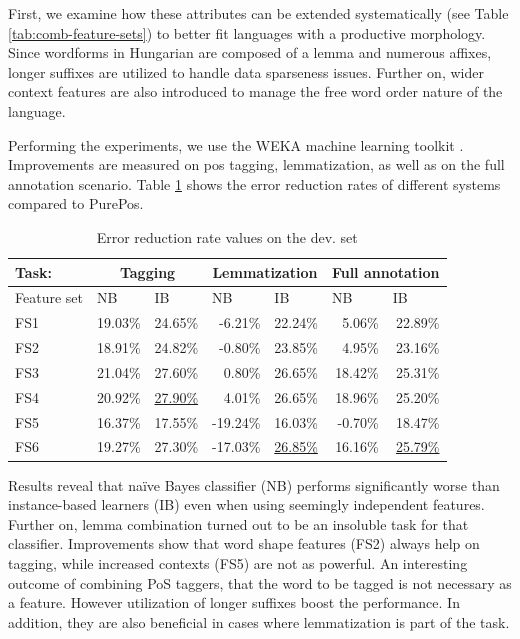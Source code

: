 First, we examine how these attributes can be extended systematically (see Table \ref{tab:comb-feature-sets}) to better fit languages with a productive morphology.
Since wordforms in Hungarian are composed of a lemma and numerous affixes, longer suffixes are utilized to handle data sparseness issues.
Further on, wider context features are also introduced to manage the free word order nature of the language. 


Performing the experiments, we use the WEKA machine learning toolkit \cite{Hall2009}.
Improvements are measured on \acrshort{pos} tagging, lemmatization, as well as on the full annotation scenario.
Table \ref{tab:comb-reduction-rates} shows the error reduction rates of different systems compared to PurePos. 

\begin{table}[h]
\centering
\caption{Error reduction rate values on the dev. set}\label{tab:comb-reduction-rates}
\begin{tabular}{l r r r r r r}
\hline
Task:& \multicolumn{2}{c}{Tagging} & \multicolumn{2}{c}{Lemmatization} & \multicolumn{2}{c}{Full annotation} \\
\hline
Feature set & \multicolumn{1}{l}{NB} & \multicolumn{1}{l}{IB} & \multicolumn{1}{l}{NB} & \multicolumn{1}{l}{IB} & \multicolumn{1}{l}{NB} & \multicolumn{1}{l}{IB} \\
\hline
FS1 & 19.03\% & 24.65\% & -6.21\% & 22.24\% & 5.06\% & 22.89\% \\
FS2 & 18.91\% & 24.82\% & -0.80\% & 23.85\% & 4.95\% & 23.16\% \\
FS3 & 21.04\% & 27.60\% & 0.80\% & 26.65\% & 18.42\% & 25.31\% \\
FS4 & 20.92\% & \underline{27.90\%} & 4.01\% & 26.65\% & 18.96\% & 25.20\% \\
FS5 & 16.37\% & 17.55\% & -19.24\% & 16.03\% & -0.70\% & 18.47\% \\
FS6 & 19.27\% & 27.30\% & -17.03\% & \underline{26.85\%} & 16.16\% & \underline{25.79\%} \\
\hline
\end{tabular}
\end{table}

Results reveal that naïve Bayes classifier (NB) performs significantly worse than instance-based learners (IB) even when using seemingly independent features.
Further on, lemma combination turned out to be an insoluble task for that classifier.
Improvements show that word shape features (FS2) always help on tagging, while increased contexts (FS5) are not as powerful.
An interesting outcome of combining PoS taggers, that the word to be tagged is not necessary as a feature.
However utilization of longer suffixes boost the performance.
In addition, they are also beneficial in cases where lemmatization is part of the task. 

